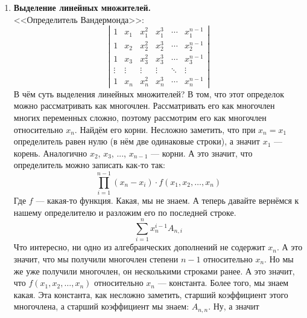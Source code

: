 \documentclass{article}
\begin{document}
\begin{enumerate}
$$\begin{matrix}
            0 & 0 & 0 & \cdots & 1
        \end{matrix}\right|
        $$
        Получим треугольную матрицу, у которой мы знаем определитель.
        \[
        \begin{split}
            \prod_{i=1}^n(a_i-x)\cdot\left(\frac{a_1}{a_1-x}+\sum_{j=2}^n\frac x{a_j-x}\right)=\\
            \prod_{i=1}^n(a_i-x)\cdot\left(1+\frac{x}{a_1-x}+\sum_{j=2}^n\frac x{a_j-x}\right)=\\
            \prod_{i=1}^n(a_i-x)\cdot\left(1+\sum_{j=1}^n\frac x{a_j-x}\right)
        \end{split}
        \]
        При большом желании можно ещё вынести отсюда $x$.
        \item \textbf{Выделение линейных множителей.}\\
        <<Определитель Вандермонда>>:
        \[
        \left|\begin{matrix}
            1 & x_1 & x_1^2 & x_1^3 & \cdots & x_1^{n-1}\\
            1 & x_2 & x_2^2 & x_2^3 & \cdots & x_2^{n-1}\\
            1 & x_3 & x_3^2 & x_3^3 & \cdots & x_3^{n-1}\\
            \vdots & \vdots & \vdots & \vdots & \ddots & \vdots\\
            1 & x_n & x_n^2 & x_n^3 & \cdots & x_n^{n-1}
        \end{matrix}\right|
        \]
        В чём суть выделения линейных множителей? В том, что этот определок можно рассматривать как многочлен. Рассматривать его как многочлен многих переменных сложно, поэтому рассмотрим его как многочлен относительно $x_n$. Найдём его корни. Несложно заметить, что при $x_n=x_1$ определитель равен нулю (в нём две одинаковые строки), а значит $x_1$ --- корень. Аналогично $x_2$, $x_3$, ..., $x_{n-1}$ --- корни. А это значит, что определитель можно записать как-то так:
        $$
        \prod_{i=1}^{n-1}(x_n-x_i)\cdot f(x_1,x_2,\ldots,x_n)
        $$
        Где $f$ --- какая-то функция. Какая, мы не знаем. А теперь давайте вернёмся к нашему определителю и разложим его по последней строке.
        $$
        \sum_{i=1}^nx_n^{i-1}A_{n,i}
        $$
        Что интересно, ни одно из алгебраических дополнений не содержит $x_n$. А это значит, что мы получили многочлен степени $n-1$ относительно $x_n$. Но мы же уже получили многочлен, он несколькими строками ранее. А это значит, что $f(x_1,x_2,\ldots,x_n)$ относительно $x_n$ --- константа. Более того, мы знаем какая. Эта константа, как несложно заметить, старший коэффициент этого многочлена, а старший коэффициент мы знаем: $A_{n,n}$. Ну, а значит

\end{enumerate}
\end{document}

